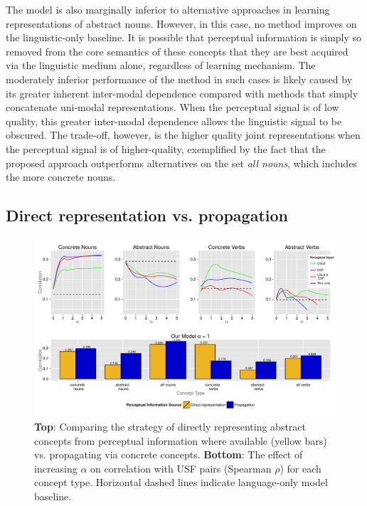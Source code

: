 The model is also marginally inferior to alternative approaches in learning representations of abstract nouns. However, in this case, no method improves on the linguistic-only baseline. It is possible that perceptual information is simply so removed from the core semantics of these concepts that they are best acquired via the linguistic medium alone, regardless of learning mechanism. The moderately inferior performance of the method in such cases is likely caused by its greater inherent inter-modal dependence compared with methods that simply concatenate uni-modal representations. When the perceptual signal is of low quality, this greater inter-modal dependence allows the linguistic signal to be obscured. The trade-off, however, is the higher quality joint representations when the perceptual signal is of higher-quality, exemplified by the fact that the proposed approach outperforms alternatives on the set \emph{all nouns}, which includes the more concrete nouns. 

\subsection{Direct representation vs. propagation}
\label{conc3}

 \begin{figure}[t] 

\includegraphics[width = \textwidth]{Chapter_3/Graph_2_EMNLP2014}  

\caption{\label{repprop} {\bf Top}: Comparing the strategy of directly representing abstract concepts from perceptual information where available (yellow bars) vs. propagating via concrete concepts. {\bf Bottom}: The effect of increasing \(\alpha\) on correlation with USF pairs (Spearman \(\rho\)) for each concept type. Horizontal dashed lines indicate language-only model baseline.}

\end{figure}

